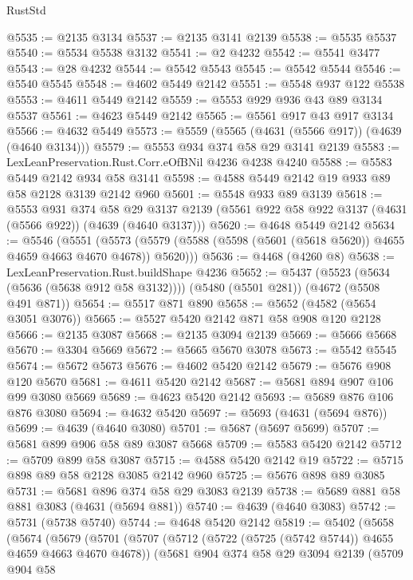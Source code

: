 \begin{lexlean}{RustStd}
\begin{coremodule}
{\begin{coremodule}
{{{{{{{{{{{{{{{{@5535 := @2135 @3134
@5537 := @2135 @3141 @2139
@5538 := @5535 @5537
@5540 := @5534 @5538 @3132
@5541 := @2 @4232
@5542 := @5541 @3477
@5543 := @28 @4232
@5544 := @5542 @5543
@5545 := @5542 @5544
@5546 := @5540 @5545
@5548 := @4602 @5449 @2142
@5551 := @5548 @937 @122 @5538
@5553 := @4611 @5449 @2142
@5559 := @5553 @929 @936 @43 @89 @3134 @5537
@5561 := @4623 @5449 @2142
@5565 := @5561 @917 @43 @917 @3134
@5566 := @4632 @5449
@5573 := @5559 (@5565 (@4631 (@5566 @917)) (@4639 (@4640 @3134)))
@5579 := @5553 @934 @374 @58 @29 @3141 @2139
@5583 := LexLeanPreservation.Rust.Corr.eOfBNil @4236 @4238 @4240
@5588 := @5583 @5449 @2142 @934 @58 @3141
@5598 := @4588 @5449 @2142 @19 @933 @89 @58 @2128 @3139 @2142 @960
@5601 := @5548 @933 @89 @3139
@5618 := @5553
    @931
    @374
    @58
    @29
    @3137
    @2139
    (@5561 @922 @58 @922 @3137 (@4631 (@5566 @922)) (@4639 (@4640 @3137)))
@5620 := @4648 @5449 @2142
@5634 := @5546
    (@5551
      (@5573 (@5579 (@5588 (@5598 (@5601 (@5618 @5620)) @4655 @4659 @4663 @4670 @4678)) @5620)))
@5636 := @4468 (@4260 @8)
@5638 := LexLeanPreservation.Rust.buildShape @4236
@5652 := @5437
    (@5523 (@5634 (@5636 (@5638 @912 @58 @3132))))
    (@5480 (@5501 @281))
    (@4672 (@5508 @491 @871))
@5654 := @5517 @871 @890
@5658 := @5652 (@4582 (@5654 @3051 @3076))
@5665 := @5527 @5420 @2142 @871 @58 @908 @120 @2128
@5666 := @2135 @3087
@5668 := @2135 @3094 @2139
@5669 := @5666 @5668
@5670 := @3304 @5669
@5672 := @5665 @5670 @3078
@5673 := @5542 @5545
@5674 := @5672 @5673
@5676 := @4602 @5420 @2142
@5679 := @5676 @908 @120 @5670
@5681 := @4611 @5420 @2142
@5687 := @5681 @894 @907 @106 @99 @3080 @5669
@5689 := @4623 @5420 @2142
@5693 := @5689 @876 @106 @876 @3080
@5694 := @4632 @5420
@5697 := @5693 (@4631 (@5694 @876))
@5699 := @4639 (@4640 @3080)
@5701 := @5687 (@5697 @5699)
@5707 := @5681 @899 @906 @58 @89 @3087 @5668
@5709 := @5583 @5420 @2142
@5712 := @5709 @899 @58 @3087
@5715 := @4588 @5420 @2142 @19
@5722 := @5715 @898 @89 @58 @2128 @3085 @2142 @960
@5725 := @5676 @898 @89 @3085
@5731 := @5681 @896 @374 @58 @29 @3083 @2139
@5738 := @5689 @881 @58 @881 @3083 (@4631 (@5694 @881))
@5740 := @4639 (@4640 @3083)
@5742 := @5731 (@5738 @5740)
@5744 := @4648 @5420 @2142
@5819 := @5402
    (@5658
      (@5674
        (@5679
          (@5701
            (@5707
              (@5712 (@5722 (@5725 (@5742 @5744)) @4655 @4659 @4663 @4670 @4678))
              (@5681
                @904
                @374
                @58
                @29
                @3094
                @2139
                (@5709
                  @904
                  @58
}}}}}}}}}}}}}}}}
\end{coremodule}}
\end{coremodule}
\end{lexlean}
